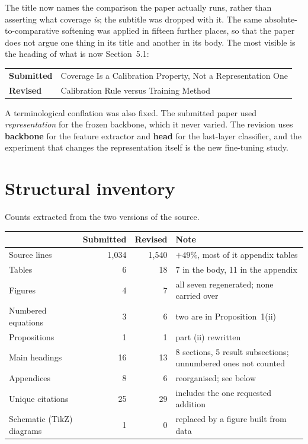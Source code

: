 \documentclass[11pt,a4paper]{article}
\newcommand{\was}[1]{\textcolor{cutred}{#1}}
\newcommand{\now}[1]{\textcolor{addblue}{#1}}
\begin{document}
The title now names the comparison the paper actually runs, rather than asserting what
coverage \emph{is}; the subtitle was dropped with it. The same absolute-to-comparative softening
was applied in fifteen further places, so that the paper does not argue one thing in its title and
another in its body. The most visible is the heading of what is now Section~5.1:

\begin{center}
\begin{tabular}{@{}L{1.9cm}L{12.6cm}@{}}
\toprule
\textbf{Submitted} & \was{Coverage Is a Calibration Property, Not a Representation One} \\
\addlinespace
\textbf{Revised} & \now{Calibration Rule versus Training Method} \\
\bottomrule
\end{tabular}
\end{center}

A terminological conflation was also fixed. The submitted paper used \emph{representation} for the
frozen backbone, which it never varied. The revision uses \textbf{backbone} for the feature extractor
and \textbf{head} for the last-layer classifier, and the experiment that changes the representation
itself is the new fine-tuning study.

\section{Structural inventory}

Counts extracted from the two versions of the source.

\begin{center}
\begin{tabular}{@{}L{5.2cm}rrL{6.0cm}@{}}
\toprule
& \textbf{Submitted} & \textbf{Revised} & \textbf{Note} \\
\midrule
Source lines & 1{,}034 & 1{,}540 & $+49\%$, most of it appendix tables \\
Tables & 6 & 18 & 7 in the body, 11 in the appendix \\
Figures & 4 & 7 & all seven regenerated; none carried over \\
Numbered equations & 3 & 6 & two are in Proposition~1(ii) \\
Propositions & 1 & 1 & part (ii) rewritten \\
Main headings & 16 & 13 & 8 sections, 5 result subsections; unnumbered ones not counted \\
Appendices & 8 & 6 & reorganised; see below \\
Unique citations & 25 & 29 & includes the one requested addition \\
Schematic (TikZ) diagrams & 1 & 0 & replaced by a figure built from data \\
\bottomrule
\end{tabular}
\end{center}
\end{document}
